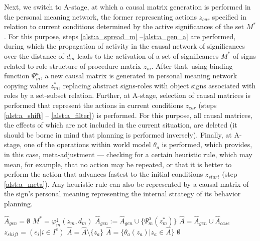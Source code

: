 \documentclass[review]{elsarticle}
\begin{document}
Next, we switch to A-stage, at which a causal matrix generation is performed in the personal meaning network, the former representing actions $z_{cur}$ specified in relation to current conditions determined by the active significances of the set $M^*$. For this purpose, steps \ref{alst:a_spread_m} --\ref{alst:a_gen_a} are performed, during which the propagation of activity in the causal network of significances over the distance of $d_m$ leads to the activation of a set of significances $M^*$ of signs related to role structure of procedure matrix $z_m$. After that, using binding function $\Psi_m^a$, a new causal matrix is generated in personal meaning network copying values $z_m^*$, replacing abstract signs-roles with object signs associated with roles by a set-subset relation. Further, at A-stage, selection of causal matrices is performed that represent the actions  in current conditions $z_{cur}$ (steps \ref{alst:a_shift} -- \ref{alst:a_filter}) is performed. For this purpose, all causal matrices, the effects of which are not included in the current situation, are deleted (it should be borne in mind that planning is performed inversely). Finally, at A-stage, one of the operations within world model $\theta_a$ is performed, which provides, in this case, meta-adjustment --- checking for a certain heuristic rule, which may mean, for example, that no action may be repeated, or that it is better to perform the action that advances fastest to the initial conditions $z_{start}$ (step \ref{alst:a_meta}). Any heuristic rule can also be represented by a causal matrix of the sign's personal meaning representing the internal strategy of its behavior planning.

\begin{algorithm}
	\begin{algorithmic}[1]
		\Statex{}
		\State $\hat A_{gen}=\emptyset$
		\Statex{}
		\State $M^*=\varphi_m^\downarrow(z_m, d_m)$\label{alst:a_spread_m}
		\State $\hat A_{gen} := \hat A_{gen}\cup\{\Psi_m^a(z_m^*)\}$ \label{alst:a_gen_a}
		\EndFor
		\EndFor
		\Statex{}
		\State $\hat A = \hat A_{gen}\cup \hat A_{case}$
		\State $z_{shift}=(e_i|i\in I^e)$ \label{alst:a_shift}
		\State $\hat A = \hat A\setminus\{z_a\}$ \label{alst:a_filter}
		\EndIf
		\EndFor
		\Statex{}
		\State $\hat A=\{\theta_a(z_a)|z_a\in\hat A\}$ \label{alst:a_meta}
		\State\Return $\emptyset$
		\EndIf
	\end{algorithmic}
\end{algorithm}
\end{document}
